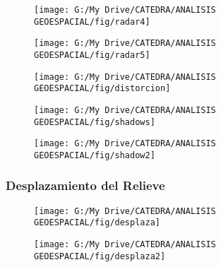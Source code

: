 \documentclass[14pt]{beamer}
\begin{document}
\begin{frame}
 \begin{figure}
    \centering
    \texttt{[image: G:/My Drive/CATEDRA/ANALISIS GEOESPACIAL/fig/radar4]}
  \end{figure}
\end{frame}
\begin{frame}
 \begin{figure}
    \centering
    \texttt{[image: G:/My Drive/CATEDRA/ANALISIS GEOESPACIAL/fig/radar5]}
  \end{figure}
\end{frame}
\begin{frame}
 \begin{figure}
    \centering
    \texttt{[image: G:/My Drive/CATEDRA/ANALISIS GEOESPACIAL/fig/distorcion]}
  \end{figure}
\end{frame}
\begin{frame}
 \begin{figure}
    \centering
    \texttt{[image: G:/My Drive/CATEDRA/ANALISIS GEOESPACIAL/fig/shadows]}
  \end{figure}
\end{frame}
\begin{frame}
 \begin{figure}
    \centering
    \texttt{[image: G:/My Drive/CATEDRA/ANALISIS GEOESPACIAL/fig/shadow2]}
  \end{figure}
\end{frame}
\begin{frame}
\frametitle{Desplazamiento del Relieve}
 \begin{figure}
    \centering
    \texttt{[image: G:/My Drive/CATEDRA/ANALISIS GEOESPACIAL/fig/desplaza]}
  \end{figure}
\end{frame}
\begin{frame}
 \begin{figure}
    \centering
    \texttt{[image: G:/My Drive/CATEDRA/ANALISIS GEOESPACIAL/fig/desplaza2]}
  \end{figure}
\end{frame}
\end{document}
